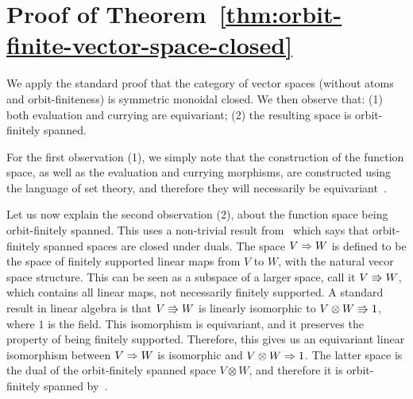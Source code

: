 \section{Proof of Theorem~\ref{thm:orbit-finite-vector-space-closed}}
 We apply the standard proof that the category of vector spaces (without atoms and orbit-finiteness) is symmetric monoidal closed. We then observe that: (1) both evaluation and currying are equivariant; (2) the resulting space is orbit-finitely spanned. 
    
    For the first observation (1), we simply note that the construction of the function space, as well as  the evaluation and currying morphisms, are constructed using the language of set theory, and therefore they will necessarily be equivariant~\cite[Equivariance Principle]{bojanczyk_slightly2018}.

    Let us now explain the second observation (2), about the function space being orbit-finitely spanned. This uses a non-trivial result from~\cite{bojanczykKM21OrbitFiniteVector} which says that orbit-finitely spanned spaces are closed under duals. 
    The space $V \Rightarrow W$ is defined to be the space of finitely supported linear maps from $V$ to $W$, with the natural vecor space structure. This can be seen as a subspace of a larger space, call it $V \Rrightarrow W$, which contains all linear maps, not necessarily finitely supported. A standard result in linear algebra is that $V \Rrightarrow W$ is linearly isomorphic to $ V \otimes W \Rrightarrow 1$, where $1$ is the field. This isomorphism is equivariant, and it preserves the property of being finitely supported. Therefore, this gives us an equivariant linear isomorphism between $V \Rightarrow W$ is isomorphic and $ V \otimes W \Rightarrow 1$. The latter space is the dual of the orbit-finitely spanned space $V \otimes W$, and therefore it is orbit-finitely spanned by~\cite[Corollary VI.5]{bojanczykKM21OrbitFiniteVector}.
    